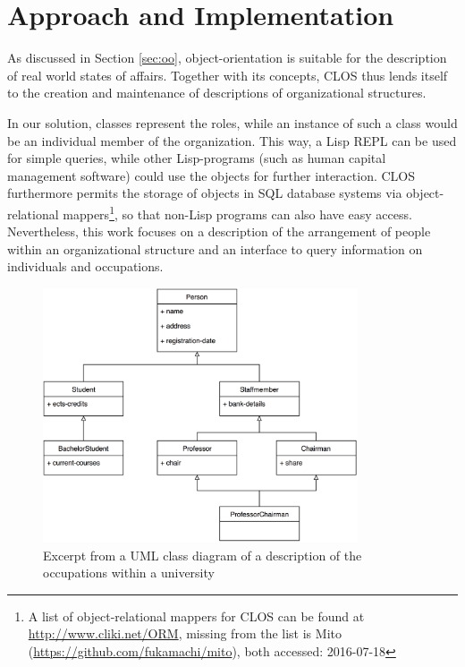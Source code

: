 \documentclass[oribibl]{llncs}
\begin{document}
\section{Approach and Implementation}
\label{sec:approach}

As discussed in Section \ref{sec:oo}, object-orientation is suitable for the description of real world states of affairs. Together with its concepts, CLOS thus lends itself to the creation and maintenance of descriptions of organizational structures.

In our solution, classes represent the roles, while an instance of such a class would be an individual member of the organization. This way, a Lisp REPL can be used for simple queries, while other Lisp-programs (such as human capital management software) could use the objects for further interaction. CLOS furthermore permits the storage of objects in SQL database systems via object-relational mappers\footnote{A list of object-relational mappers for CLOS can be found at \url{http://www.cliki.net/ORM}, missing from the list is Mito (\url{https://github.com/fukamachi/mito}), both accessed: 2016-07-18}, so that non-Lisp programs can also have easy access. Nevertheless, this work focuses on a description of the arrangement of people within an organizational structure and  an interface to query information on individuals and occupations.
\newline

\begin{figure}[]
    \centering
    \includegraphics[width=0.83\textwidth]{images/class-diagram.png}
    \caption{Excerpt from a UML class diagram of a description of the occupations within a university}
    \label{fig:class-diagram}
\end{figure}
\end{document}
